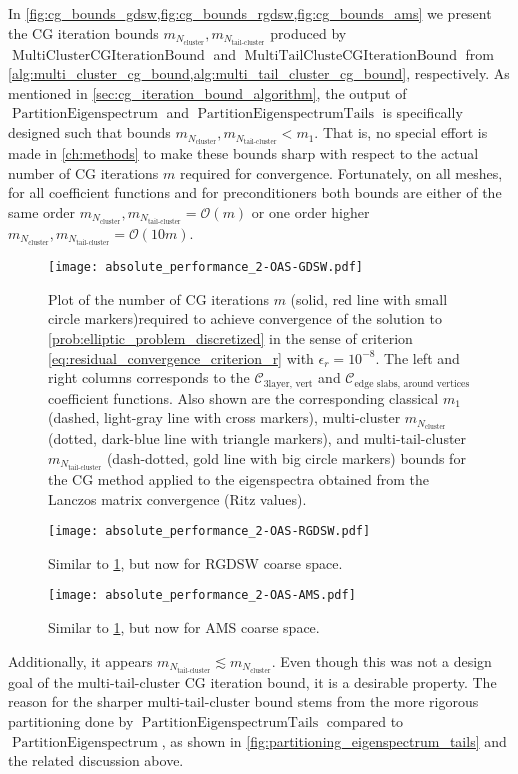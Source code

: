 In \cref{fig:cg_bounds_gdsw,fig:cg_bounds_rgdsw,fig:cg_bounds_ams} we present the CG iteration bounds $m_{N_{\text{cluster}}}, m_{N_{\text{tail-cluster}}}$ produced by \newline$\operatorname{MultiClusterCGIterationBound}$ and $\operatorname{MultiTailClusteCGIterationBound}$ from \cref{alg:multi_cluster_cg_bound,alg:multi_tail_cluster_cg_bound}, respectively. As mentioned in \cref{sec:cg_iteration_bound_algorithm}, the output of $\operatorname{PartitionEigenspectrum}$ and \newline$\operatorname{PartitionEigenspectrumTails}$ is specifically designed such that bounds $m_{N_{\text{cluster}}}, m_{N_{\text{tail-cluster}}} < m_1$. That is, no special effort is made in \cref{ch:methods} to make these bounds sharp with respect to the actual number of CG iterations $m$ required for convergence. Fortunately, on all meshes, for all coefficient functions and for preconditioners both bounds are either of the same order $m_{N_{\text{cluster}}}, m_{N_{\text{tail-cluster}}} = \mathcal{O}(m)$ or one order higher $m_{N_{\text{cluster}}}, m_{N_{\text{tail-cluster}}} = \mathcal{O}(10m)$.
\begin{figure}[H]
    \centering
    \texttt{[image: absolute\_performance\_2-OAS-GDSW.pdf]}
    \caption{Plot of the number of CG iterations $m$ (solid, red line with small circle markers)required to achieve convergence of the solution to \cref{prob:elliptic_problem_discretized} in the sense of criterion \cref{eq:residual_convergence_criterion_r} with $\epsilon_r=10^{-8}$. The left and right columns corresponds to the $\mathcal{C}_{\text{3layer, vert}}$ and $\mathcal{C}_{\text{edge slabs, around vertices}}$ coefficient functions. Also shown are the corresponding classical $m_1$ (dashed, light-gray line with cross markers), multi-cluster $m_{N_{\text{cluster}}}$ (dotted, dark-blue line with triangle markers), and multi-tail-cluster $m_{N_{\text{tail-cluster}}}$ (dash-dotted, gold line with big circle markers) bounds for the CG method applied to the eigenspectra obtained from the Lanczos matrix convergence (Ritz values).}
    \label{fig:cg_bounds_gdsw}
\end{figure}
\begin{figure}[H]
    \centering\texttt{[image: absolute\_performance\_2-OAS-RGDSW.pdf]}
    \caption{Similar to \cref{fig:cg_bounds_gdsw}, but now for RGDSW coarse space.}
    \label{fig:cg_bounds_rgdsw}
\end{figure}
\begin{figure}[H]
    \centering\texttt{[image: absolute\_performance\_2-OAS-AMS.pdf]}
    \caption{Similar to \cref{fig:cg_bounds_gdsw}, but now for AMS coarse space.}
    \label{fig:cg_bounds_ams}
\end{figure}
Additionally, it appears $m_{N_{\text{tail-cluster}}} \lesssim m_{N_{\text{cluster}}}$. Even though this was not a design goal of the multi-tail-cluster CG iteration bound, it is a desirable property. The reason for the sharper multi-tail-cluster bound stems from the more rigorous partitioning done by $\operatorname{PartitionEigenspectrumTails}$ compared to $\operatorname{PartitionEigenspectrum}$, as shown in \cref{fig:partitioning_eigenspectrum_tails} and the related discussion above.

